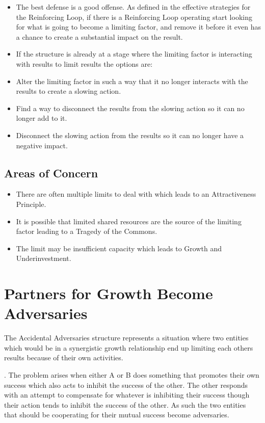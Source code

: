 \documentclass[]{memoir}
\begin{document}
\begin{itemize}
\itemsep1pt\parskip0pt
\item
  The best defense is a good offense. As defined in the effective
  strategies for the Reinforcing Loop, if there is a Reinforcing Loop
  operating start looking for what is going to become a limiting factor,
  and remove it before it even has a chance to create a substantial
  impact on the result.
\item
  If the structure is already at a stage where the limiting factor is
  interacting with results to limit results the options are:
\item
  Alter the limiting factor in such a way that it no longer interacts
  with the results to create a slowing action.
\item
  Find a way to disconnect the results from the slowing action so it can
  no longer add to it.
\item
  Disconnect the slowing action from the results so it can no longer
  have a negative impact.
\end{itemize}

\subsection{Areas of Concern}

\begin{itemize}
\itemsep1pt\parskip0pt
\item
  There are often multiple limits to deal with which leads to an
  Attractiveness Principle.
\item
  It is possible that limited shared resources are the source of the
  limiting factor leading to a Tragedy of the Commons.
\item
  The limit may be insufficient capacity which leads to Growth and
  Underinvestment.
\end{itemize}

\section{Partners for Growth Become Adversaries}

The Accidental Adversaries structure represents a situation where two
entities which would be in a synergistic growth relationship end up
limiting each others results because of their own activities.

. The problem arises when either A or B does something that promotes
their own success which also acts to inhibit the success of the other.
The other responds with an attempt to compensate for whatever is
inhibiting their success though their action tends to inhibit the
success of the other. As such the two entities that should be
cooperating for their mutual success become adversaries.
\end{document}
